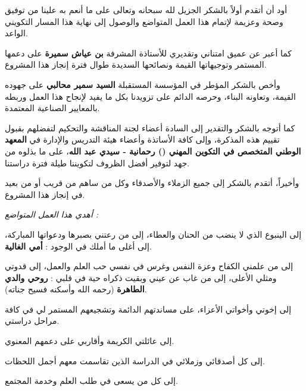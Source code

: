 \documentclass{bts-report-ar}
\begin{document}
\setRTL

\maketitlepage

\setcounter{page}{1}

\begin{shokr}
أود أن أتقدم أولاً بالشكر الجزيل لله سبحانه وتعالى على ما أنعم به علينا من توفيق وصحة وعزيمة لإتمام هذا العمل المتواضع والوصول إلى نهاية هذا المسار التكويني الواعد.

كما أعبر عن عميق امتناني وتقديري للأستاذة المشرفة \textbf{بن عياش سميرة} على دعمها المستمر وتوجيهاتها القيمة ونصائحها السديدة طوال فترة إنجاز هذا المشروع.

وأخص بالشكر المؤطر في المؤسسة المستقبلة \textbf{السيد سمير محالبي} على جهوده القيمة، وتعاونه البناء، وحرصه الدائم على تزويدنا بكل ما يفيد لإنجاح هذا العمل وربطه بالمعايير الصناعية المعتمدة.

كما أتوجه بالشكر والتقدير إلى السادة أعضاء لجنة المناقشة والتحكيم لتفضلهم بقبول تقييم هذه المذكرة، وإلى كافة الأساتذة وأعضاء هيئة التدريس والإدارة في \textbf{المعهد الوطني المتخصص في التكوين المهني () رحمانية - سيدي عبد الله}، على ما بذلوه من جهد لتوفير أفضل الظروف لتكويننا طيلة فترة دراستنا.

وأخيراً، أتقدم بالشكر إلى جميع الزملاء والأصدقاء وكل من ساهم من قريب أو من بعيد في إنجاز هذا المشروع.
\end{shokr}

\begin{ihda}
\begin{center}
\vspace*{2cm}
{\itshape
أهدي هذا العمل المتواضع :

إلى الينبوع الذي لا ينضب من الحنان والعطاء، إلى من رعتني بصبرها ودعواتها المباركة، إلى أغلى ما أملك في الوجود : \textbf{أمي الغالية}.

إلى من علمني الكفاح وعزة النفس وغرس في نفسي حب العلم والعمل، إلى قدوتي ومثلي الأعلى، إلى من غاب عن عيني وبقيت ذكراه حية في قلبي : \textbf{روحي والدي الطاهرة} (رحمه الله وأسكنه فسيح جناته).

إلى إخوتي وأخواتي الأعزاء، على مساندتهم الدائمة وتشجيعهم المستمر لي في كافة مراحل دراستي.

إلى عائلتي الكريمة وأقاربي على دعمهم المعنوي.

إلى كل أصدقائي وزملائي في الدراسة الذين تقاسمت معهم أجمل اللحظات.

إلى كل من يسعى في طلب العلم وخدمة المجتمع.
}
\end{center}
\end{ihda}
\end{document}
